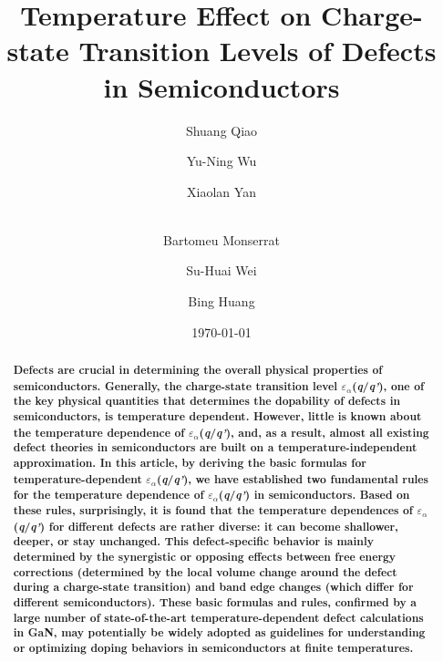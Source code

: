 \documentclass[onecolumn,preprint,superscriptaddress]{revtex4-1}
\begin{document}
\title{Temperature Effect on Charge-state Transition Levels of Defects in Semiconductors}

\author{Shuang Qiao}

\author{Yu-Ning Wu}

\author{Xiaolan Yan}

\author{\\Bartomeu Monserrat}

\author{Su-Huai Wei}

\author{Bing Huang}

\date{\today}

\newpage
\begin{abstract}
\textbf{Defects are crucial in determining the overall physical properties of semiconductors. Generally, the charge-state transition level $\varepsilon$$_{\alpha}$(\emph{q}/\emph{q'}), one of the key physical quantities that determines the dopability of defects in semiconductors, is temperature dependent. However, little is known about the temperature dependence of $\varepsilon$$_{\alpha}$(\emph{q}/\emph{q'}), and, as a result, almost all existing defect theories in semiconductors are built on a temperature-independent approximation. In this article, by deriving the basic formulas for temperature-dependent $\varepsilon$$_{\alpha}$(\emph{q}/\emph{q'}), we have established two fundamental rules for the temperature dependence of $\varepsilon$$_{\alpha}$(\emph{q}/\emph{q'}) in semiconductors. Based on these rules, surprisingly, it is found that the temperature dependences of $\varepsilon$$_{\alpha}$(\emph{q}/\emph{q'}) for different defects are rather diverse: it can become shallower, deeper, or stay unchanged. This defect-specific behavior is mainly determined by the synergistic or opposing effects between free energy corrections (determined by the local volume change around the defect during a charge-state transition) and band edge changes (which differ for different semiconductors). These basic formulas and rules, confirmed by a large number of state-of-the-art temperature-dependent defect calculations in GaN, may potentially be widely adopted as guidelines for understanding or optimizing doping behaviors in semiconductors at finite temperatures.}
\end{abstract}
\end{document}

